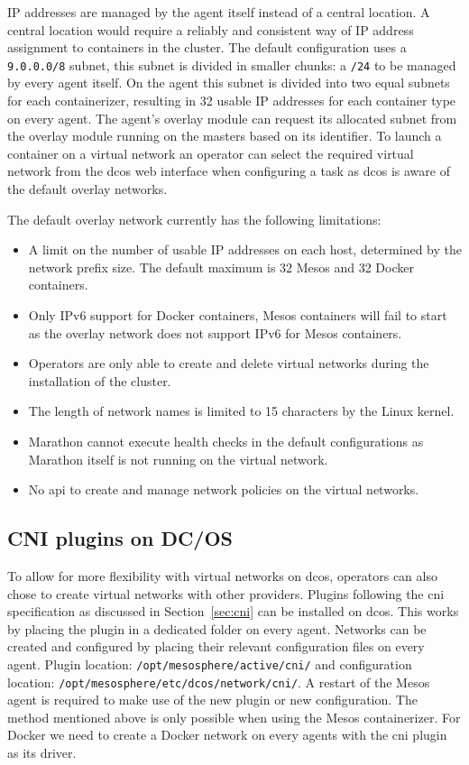 IP addresses are managed by the agent itself instead of a central location. A central location would require a reliably and consistent way of IP address assignment to containers in the cluster. The default configuration uses a \texttt{9.0.0.0/8} subnet, this subnet is divided in smaller chunks: a \texttt{/24} to be managed by every agent itself. On the agent this subnet is divided into two equal subnets for each containerizer, resulting in 32 usable IP addresses for each container type on every agent. The agent's overlay module can request its allocated subnet from the overlay module running on the masters based on its identifier. To launch a container on a virtual network an operator can select the required virtual network from the \gls{dcos} web interface when configuring a task as \gls{dcos} is aware of the default overlay networks.

The default overlay network currently has the following limitations:
\begin{itemize}
    \item A limit on the number of usable IP addresses on each host, determined by the network prefix size. The default maximum is 32 Mesos and 32 Docker containers.
    \item Only IPv6 support for Docker containers, Mesos containers will fail to start as the overlay network does not support IPv6 for Mesos containers.
    \item Operators are only able to create and delete virtual networks during the installation of the cluster.
    \item The length of network names is limited to 15 characters by the Linux kernel.
    \item Marathon cannot execute health checks in the default configurations as Marathon itself is not running on the virtual network.
    \item No \gls{api} to create and manage network policies on the virtual networks.
\end{itemize}

\subsection{CNI plugins on DC/OS}
\label{subsec:dcos-cni}
To allow for more flexibility with virtual networks on \gls{dcos}, operators can also chose to create virtual networks with other providers. Plugins following the \gls{cni} specification as discussed in Section~\ref{sec:cni} can be installed on \gls{dcos}. This works by placing the plugin in a dedicated folder on every agent. Networks can be created and configured by placing their relevant configuration files on every agent. Plugin location: \texttt{/opt/mesosphere/active/cni/} and configuration location: \texttt{/opt/mesosphere/etc/dcos/network/cni/}. A restart of the Mesos agent is required to make use of the new plugin or new configuration. The method mentioned above is only possible when using the Mesos containerizer. For Docker we need to create a Docker network on every agents with the \gls{cni} plugin as its driver.

